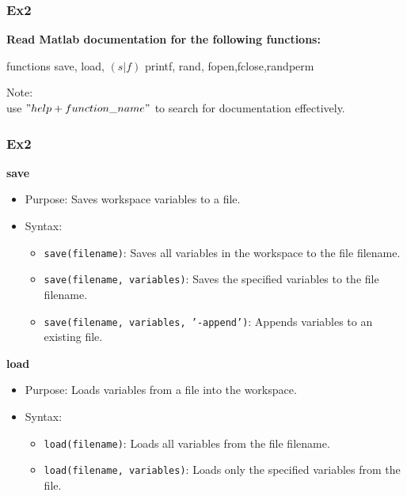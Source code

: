 \documentclass[
	11pt, %
]{beamer}
\begin{document}

\begin{frame}
	\frametitle{Ex2}
	
	\textbf{Read Matlab documentation for the following functions:}
	
	\smallskip %
	\begin{block}{functions}
        save, load, $(s|f)$ printf, rand, fopen,fclose,randperm
    \end{block}
	\bigskip

    Note: \\ use \textbf{$"help  + function\_name"$} to search for documentation effectively.
	
	\end{frame}


\begin{frame}
	\frametitle{Ex2}
	
	\textbf{save}
	
    \begin{itemize}
        \item Purpose: Saves workspace variables to a file.
        \item Syntax:
            \begin{itemize}
                \item \texttt{save(filename)}: Saves all variables in the workspace to the file filename.
                \item \texttt{save(filename, variables)}: Saves the specified variables to the file filename.
                \item \texttt{save(filename, variables, '-append')}: Appends variables to an existing file.
            \end{itemize}
    \end{itemize}
    \smallskip
    \textbf{load}
	
    \begin{itemize}
        \item Purpose: Loads variables from a file into the workspace.
        \item Syntax:
            \begin{itemize}
                \item \texttt{load(filename)}: Loads all variables from the file filename.
                \item \texttt{load(filename, variables)}: Loads only the specified variables from the file.
            \end{itemize}
    \end{itemize}
	
	
	\end{frame}
\end{document}
